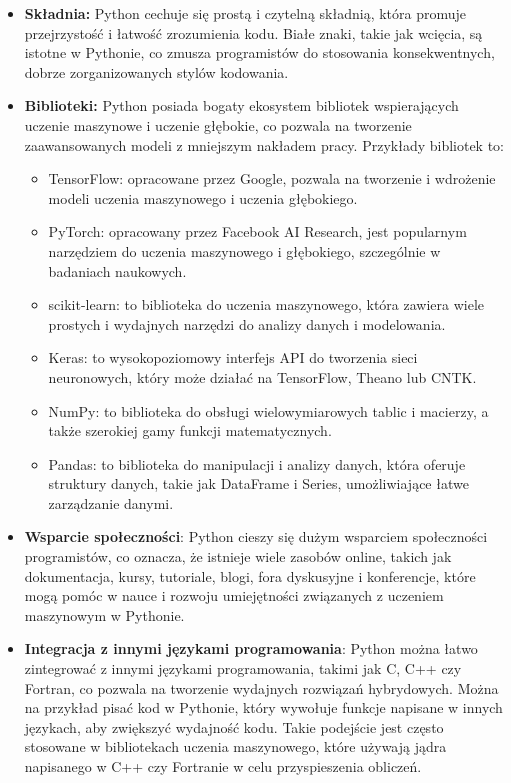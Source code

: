 \begin{itemize}
\item \textbf{Składnia:} Python cechuje się prostą i czytelną składnią, która promuje przejrzystość i łatwość zrozumienia kodu. Białe znaki, takie jak wcięcia, są istotne w Pythonie, co zmusza programistów do stosowania konsekwentnych, dobrze zorganizowanych stylów kodowania.

\item \textbf{Biblioteki:} Python posiada bogaty ekosystem bibliotek wspierających uczenie maszynowe i uczenie głębokie, co pozwala na tworzenie zaawansowanych modeli z mniejszym nakładem pracy. Przykłady bibliotek to:
\begin{itemize}
    \item TensorFlow: opracowane przez Google, pozwala na tworzenie i wdrożenie modeli uczenia maszynowego i uczenia głębokiego.
    \item PyTorch: opracowany przez Facebook AI Research, jest popularnym narzędziem do uczenia maszynowego i głębokiego, szczególnie w badaniach naukowych.
    \item scikit-learn: to biblioteka do uczenia maszynowego, która zawiera wiele prostych i wydajnych narzędzi do analizy danych i modelowania.
    \item Keras: to wysokopoziomowy interfejs API do tworzenia sieci neuronowych, który może działać na TensorFlow, Theano lub CNTK.
    \item NumPy: to biblioteka do obsługi wielowymiarowych tablic i macierzy, a także szerokiej gamy funkcji matematycznych.
    \item Pandas: to biblioteka do manipulacji i analizy danych, która oferuje struktury danych, takie jak DataFrame i Series, umożliwiające łatwe zarządzanie danymi.
\end{itemize}

\item \textbf{Wsparcie społeczności}: Python cieszy się dużym wsparciem społeczności programistów, co oznacza, że istnieje wiele zasobów online, takich jak dokumentacja, kursy, tutoriale, blogi, fora dyskusyjne i konferencje, które mogą pomóc w nauce i rozwoju umiejętności związanych z uczeniem maszynowym w Pythonie.

\item \textbf{Integracja z innymi językami programowania}: Python można łatwo zintegrować z innymi językami programowania, takimi jak C, C++ czy Fortran, co pozwala na tworzenie wydajnych rozwiązań hybrydowych. Można na przykład pisać kod w Pythonie, który wywołuje funkcje napisane w innych językach, aby zwiększyć wydajność kodu. Takie podejście jest często stosowane w bibliotekach uczenia maszynowego, które używają jądra napisanego w C++ czy Fortranie w celu przyspieszenia obliczeń.


\end{itemize}

